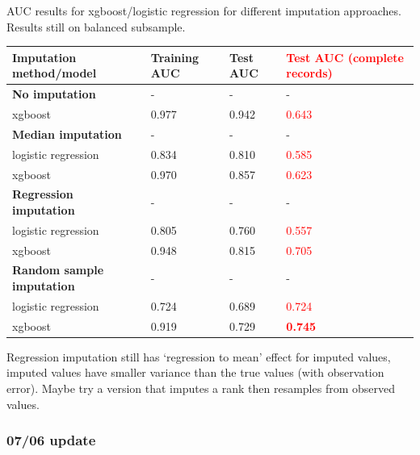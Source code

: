 \documentclass[12pt]{article}
\newcommand{\note}[1]{\textcolor{red}{#1}}
\begin{document}
AUC results for xgboost/logistic regression for different imputation approaches. Results still on balanced subsample.
\begin{center}
\begin{tabular}{|l|l|l|l|}
\hline
\textbf{Imputation method/model} & \textbf{Training AUC} & \textbf{Test AUC} & \note{\textbf{Test AUC (complete records)}} \\ \hline
{\bf No imputation} & - & - & - \\ \hline
xgboost & 0.977 & 0.942 & \note{0.643} \\ \hline
{\bf Median imputation} & - & - & - \\ \hline
logistic regression & 0.834 & 0.810 & \note{0.585} \\ \hline
xgboost & 0.970 & 0.857 & \note{0.623} \\ \hline
{\bf Regression imputation} & - & - & - \\ \hline
logistic regression & 0.805 & 0.760 & \note{0.557} \\ \hline
xgboost & 0.948 & 0.815 & \note{0.705} \\ \hline
{\bf Random sample imputation} & - & - & - \\ \hline
logistic regression & 0.724 & 0.689 & \note{0.724} \\ \hline
xgboost & 0.919 & 0.729 & \note{\textbf{0.745}} \\ \hline
\end{tabular}
\end{center}

Regression imputation still has `regression to mean' effect for imputed values, imputed values have smaller variance than the true values (with observation error). Maybe try a version that imputes a rank then resamples from observed values.

%
%
%

\pagebreak

\subsubsection*{07/06 update}
\end{document}
